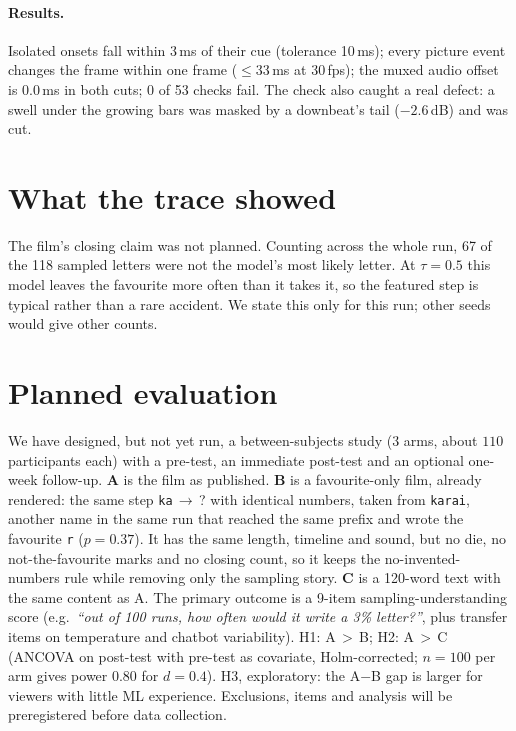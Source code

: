 \documentclass[10pt,twocolumn]{article}
\newcommand{\tok}[1]{\texttt{#1}}
\begin{document}
\paragraph{Results.} Isolated onsets fall within 3\,ms of their cue (tolerance 10\,ms); every picture event
changes the frame within one frame (${\le}33$\,ms at 30\,fps); the muxed audio offset is 0.0\,ms in both cuts;
0 of 53 checks fail. The check also caught a real defect: a swell under the growing bars was masked by a
downbeat's tail ($-2.6$\,dB) and was cut.

\section{What the trace showed}
The film's closing claim was not planned. Counting across the whole run, 67 of the 118 sampled letters were
not the model's most likely letter. At $\tau = 0.5$ this model leaves the favourite more often than it takes it,
so the featured step is typical rather than a rare accident. We state this only for this run;
other seeds would give other counts.

\section{Planned evaluation}
We have designed, but not yet run, a between-subjects study ($3$ arms, about $110$ participants each) with a pre-test,
an immediate post-test and an optional one-week follow-up.
\textbf{A} is the film as published. \textbf{B} is a favourite-only film, already rendered: the same step \tok{ka}$\,\to\,$? with identical numbers,
taken from \tok{karai}, another name in the same run that reached the same prefix and wrote the favourite \tok{r} ($p=0.37$).
It has the same length, timeline and sound, but no die, no not-the-favourite marks and no closing count,
so it keeps the no-invented-numbers rule while removing only the sampling story.
\textbf{C} is a 120-word text with the same content as A.
The primary outcome is a 9-item sampling-understanding score (e.g.\ \emph{``out of 100 runs, how often would it write a 3\% letter?''},
plus transfer items on temperature and chatbot variability). H1: A\,$>$\,B; H2: A\,$>$\,C (ANCOVA on post-test with pre-test as covariate,
Holm-corrected; $n=100$ per arm gives power $0.80$ for $d=0.4$). H3, exploratory: the A$-$B gap is larger for viewers with little ML experience.
Exclusions, items and analysis will be preregistered before data collection.
\end{document}
